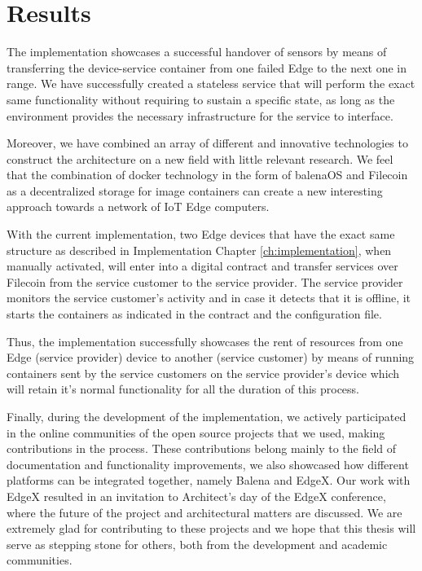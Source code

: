 \chapter{Results} \label{ch:results}

The implementation showcases a successful handover of sensors by means of transferring the device-service container from one failed Edge to the next one in range. We have successfully created a stateless service that will perform the exact same functionality without requiring to sustain a specific state, as long as the environment provides the necessary infrastructure for the service to interface.

Moreover, we have combined an array of different and innovative technologies to construct the architecture on a new field with little relevant research. We feel that the combination of docker technology in the form of balenaOS and Filecoin as a decentralized storage for image containers can create a new interesting approach towards a network of IoT Edge computers.   

With the current implementation, two Edge devices that have the exact same structure as described in Implementation Chapter \ref{ch:implementation}, when manually activated, will enter into a digital contract and transfer services over Filecoin from the service customer to the service provider. The service provider monitors the service customer’s activity and in case it detects that it is offline, it starts the containers as indicated in the contract and the configuration file.

Thus, the implementation successfully showcases the rent of resources from one Edge (service provider) device to another (service customer) by means of running containers sent by the service customers on the service provider’s device which will retain it’s normal functionality for all the duration of this process.

Finally, during the development of the implementation, we actively participated in the online communities of the open source projects that we used, making contributions in the process. These contributions belong mainly to the field of documentation and functionality improvements, we also showcased how different platforms can be integrated together, namely Balena and EdgeX\cite{edgexbalenaodys}. Our work with EdgeX resulted in an invitation to Architect's day of the EdgeX conference, where the future of the project and architectural matters are discussed. We are extremely glad for contributing to these projects and we hope that this thesis will serve as stepping stone for others, both from the development and academic communities.